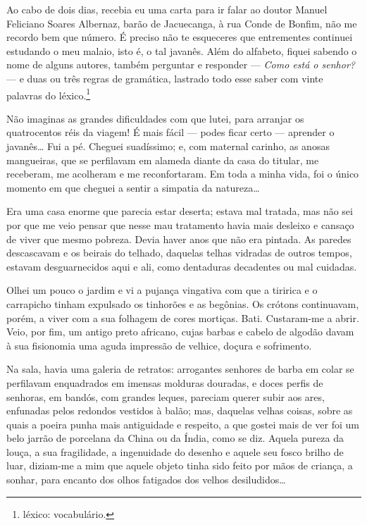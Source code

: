Ao cabo de dois dias, recebia eu uma carta para ir falar ao doutor
Manuel Feliciano Soares Albernaz, barão de Jacuecanga, à rua Conde de
Bonfim, não me recordo bem que número. É preciso não te esqueceres que
entrementes continuei estudando o meu malaio, isto é, o tal javanês.
Além do alfabeto, fiquei sabendo o nome de alguns autores, também
perguntar e responder --- \emph{Como está o senhor?} --- e duas ou três
regras de gramática, lastrado todo esse saber com vinte palavras do
léxico.\footnote{léxico: vocabulário.}

Não imaginas as grandes dificuldades com que lutei, para arranjar os
quatrocentos réis da viagem! É mais fácil --- podes ficar certo ---
aprender o javanês\ldots{} Fui a pé. Cheguei suadíssimo; e, com maternal
carinho, as anosas mangueiras, que se perfilavam em alameda diante da
casa do titular, me receberam, me acolheram e me reconfortaram. Em toda
a minha vida, foi o único momento em que cheguei a sentir a simpatia da
natureza\ldots{}

Era uma casa enorme que parecia estar deserta; estava mal tratada, mas
não sei por que me veio pensar que nesse mau tratamento havia mais
desleixo e cansaço de viver que mesmo pobreza. Devia haver anos que não
era pintada. As paredes descascavam e os beirais do telhado, daquelas
telhas vidradas de outros tempos, estavam desguarnecidos aqui e ali,
como dentaduras decadentes ou mal cuidadas.

Olhei um pouco o jardim e vi a pujança vingativa com que a tiririca e o
carrapicho tinham expulsado os tinhorões e as begônias. Os crótons
continuavam, porém, a viver com a sua folhagem de cores mortiças. Bati.
Custaram-me a abrir. Veio, por fim, um antigo preto africano, cujas
barbas e cabelo de algodão davam à sua fisionomia uma aguda impressão de
velhice, doçura e sofrimento.

Na sala, havia uma galeria de retratos: arrogantes senhores de barba em
colar se perfilavam enquadrados em imensas molduras douradas, e doces
perfis de senhoras, em bandós, com grandes leques, pareciam querer subir
aos ares, enfunadas pelos redondos vestidos à balão; mas, daquelas
velhas coisas, sobre as quais a poeira punha mais antiguidade e
respeito, a que gostei mais de ver foi um belo jarrão de porcelana da
China ou da Índia, como se diz. Aquela pureza da louça, a sua
fragilidade, a ingenuidade do desenho e aquele seu fosco brilho de luar,
diziam-me a mim que aquele objeto tinha sido feito por mãos de criança,
a sonhar, para encanto dos olhos fatigados dos velhos
desiludidos\ldots{}

